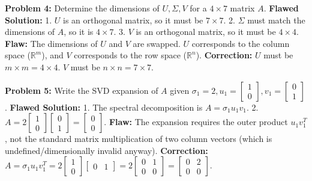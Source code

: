 \documentclass[11pt, letterpaper]{article}
\theoremstyle{definition}
\theoremstyle{remark}
\newcommand{\R}{\mathbb{R}}
\begin{document}
\vspace{1em}
\textbf{Problem 4:} Determine the dimensions of $U, \Sigma, V$ for a $4 \times 7$ matrix $A$.
\textbf{Flawed Solution:}
1. $U$ is an orthogonal matrix, so it must be $7 \times 7$.
2. $\Sigma$ must match the dimensions of $A$, so it is $4 \times 7$.
3. $V$ is an orthogonal matrix, so it must be $4 \times 4$.
\textbf{Flaw:} The dimensions of $U$ and $V$ are swapped. $U$ corresponds to the column space ($\R^m$), and $V$ corresponds to the row space ($\R^n$).
\textbf{Correction:} $U$ must be $m \times m = 4 \times 4$. $V$ must be $n \times n = 7 \times 7$.

\vspace{1em}
\textbf{Problem 5:} Write the SVD expansion of $A$ given $\sigma_1=2, u_1=\begin{bmatrix} 1 \\ 0 \end{bmatrix}, v_1=\begin{bmatrix} 0 \\ 1 \end{bmatrix}$.
\textbf{Flawed Solution:}
1. The spectral decomposition is $A = \sigma_1 u_1 v_1$.
2. $A = 2 \begin{bmatrix} 1 \\ 0 \end{bmatrix} \begin{bmatrix} 0 \\ 1 \end{bmatrix} = \begin{bmatrix} 0 \\ 0 \end{bmatrix}$.
\textbf{Flaw:} The expansion requires the outer product $u_1 v_1^T$, not the standard matrix multiplication of two column vectors (which is undefined/dimensionally invalid anyway).
\textbf{Correction:} $A = \sigma_1 u_1 v_1^T = 2 \begin{bmatrix} 1 \\ 0 \end{bmatrix} \begin{bmatrix} 0 & 1 \end{bmatrix} = 2 \begin{bmatrix} 0 & 1 \\ 0 & 0 \end{bmatrix} = \begin{bmatrix} 0 & 2 \\ 0 & 0 \end{bmatrix}$.
\end{document}
